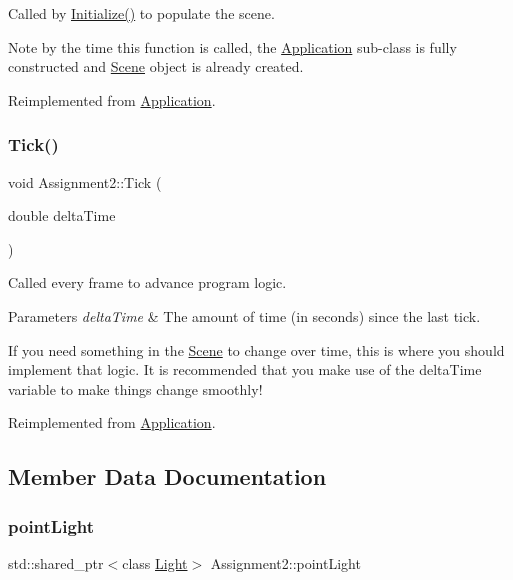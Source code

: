 Called by \hyperlink{class_application_a17cf1ea4552d26a1c20f7d98d793d41d}{Initialize()} to populate the scene.

Note by the time this function is called, the \hyperlink{class_application}{Application} sub-\/class is fully constructed and \hyperlink{class_scene}{Scene} object is already created.

Reimplemented from \hyperlink{class_application_aa8e8017ef8dd86293c96d0645e66d440}{Application}.

\hypertarget{class_assignment2_a41544ad361dd798d5fae1ec3197fc66e}{}\label{class_assignment2_a41544ad361dd798d5fae1ec3197fc66e}
\subsubsection{\texorpdfstring{Tick()}{Tick()}}
{\footnotesize\ttfamily void Assignment2\+::\+Tick (\begin{DoxyParamCaption}\item[{double}]{delta\+Time }\end{DoxyParamCaption})\hspace{0.3cm}{\ttfamily [virtual]}}



Called every frame to advance program logic.


\begin{DoxyParams}{Parameters}
{\em delta\+Time} & The amount of time (in seconds) since the last tick.\\
\hline
\end{DoxyParams}
If you need something in the \hyperlink{class_scene}{Scene} to change over time, this is where you should implement that logic. It is recommended that you make use of the delta\+Time variable to make things change smoothly!

Reimplemented from \hyperlink{class_application_a0800afd5651153d31fa775a8048d14dd}{Application}.



\subsection{Member Data Documentation}
\hypertarget{class_assignment2_abaf6127e0de097717673c0d9b04f8c79}{}\label{class_assignment2_abaf6127e0de097717673c0d9b04f8c79}
\subsubsection{\texorpdfstring{point\+Light}{pointLight}}
{\footnotesize\ttfamily std\+::shared\+\_\+ptr$<$class \hyperlink{class_light}{Light}$>$ Assignment2\+::point\+Light\hspace{0.3cm}{\ttfamily [private]}}

